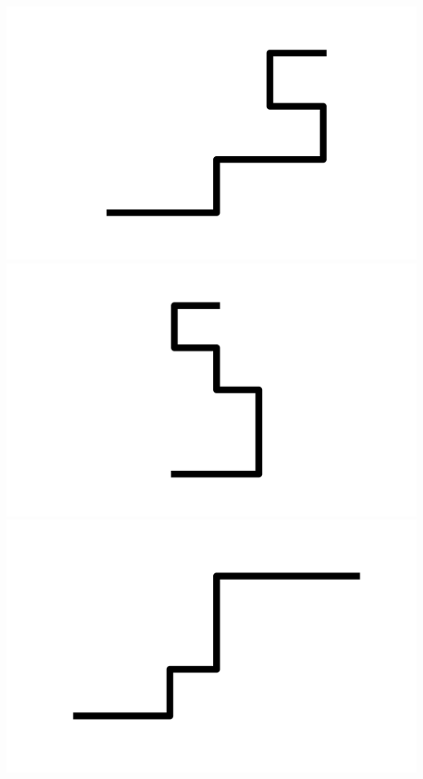 \documentclass[]{report}
\begin{document}
\includegraphics[scale=.1]{pictures/21/state_cluster_shapes_487.pdf} 
\includegraphics[scale=.1]{pictures/21/state_cluster_shapes_488.pdf} 
\includegraphics[scale=.1]{pictures/21/state_cluster_shapes_489.pdf} 
\end{document}

